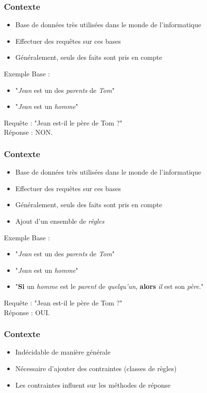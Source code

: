 
\begin{frame}
	\frametitle{Contexte}
	\begin{itemize}
		\item Base de données très utilisées dans le monde de l'informatique
		\item Effectuer des requêtes sur ces bases
		\item Généralement, seuls des faits sont pris en compte
	\end{itemize}
	\begin{exampleblock}{Exemple}
		Base :
		\begin{itemize}
			\item "{\em Jean} est un des {\em parents} de {\em Tom}"
			\item "{\em Jean} est un {\em homme}"
		\end{itemize}
		Requête : "Jean est-il le père de Tom ?"\\
		Réponse : NON.
	\end{exampleblock}
\end{frame}

\begin{frame}
	\frametitle{Contexte}
	\begin{itemize}
		\item Base de données très utilisées dans le monde de l'informatique
		\item Effectuer des requêtes sur ces bases
		\item Généralement, seuls des faits sont pris en compte
		\item Ajout d'un ensemble de {\em règles}
	\end{itemize}
	\begin{exampleblock}{Exemple}
		Base :
		\begin{itemize}
			\item "{\em Jean} est un des {\em parents} de {\em Tom}"
			\item "{\em Jean} est un {\em homme}"
			\item "{\bf Si} un {\em homme} est le {\em parent} de {\em quelqu'un}, {\bf
			alors} {\em il} est son {\em père}." 
		\end{itemize}
		Requête : "Jean est-il le père de Tom ?"\\
		Réponse : OUI.
	\end{exampleblock}
\end{frame}

\begin{frame}
	\frametitle{Contexte}
	\begin{itemize}
		\item Indécidable de manière générale
		\item Nécessaire d'ajouter des contraintes (classes de règles) 
		\item Les contraintes influent sur les méthodes de réponse
	\end{itemize}
\end{frame}



